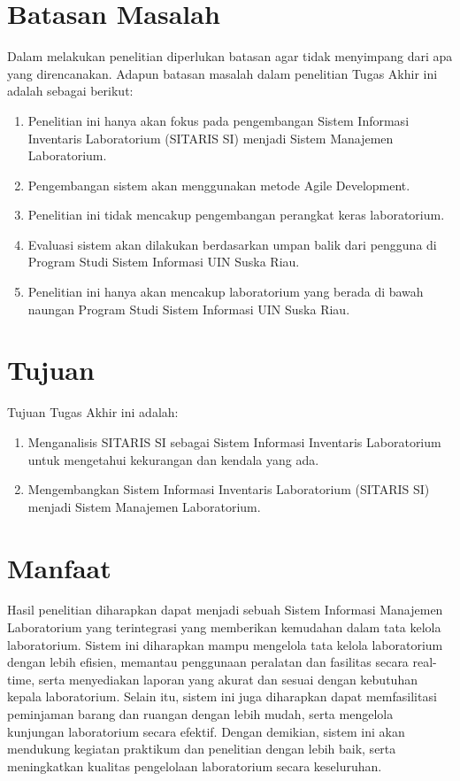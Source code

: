 \section{Batasan Masalah}
Dalam melakukan penelitian diperlukan batasan agar tidak menyimpang dari apa yang direncanakan. Adapun batasan masalah dalam penelitian Tugas Akhir ini adalah sebagai berikut:
\begin{enumerate}
	\item Penelitian ini hanya akan fokus pada pengembangan Sistem Informasi Inventaris Laboratorium (SITARIS SI) menjadi Sistem Manajemen Laboratorium.
	\item Pengembangan sistem akan menggunakan metode Agile Development.
	\item Penelitian ini tidak mencakup pengembangan perangkat keras laboratorium.
	\item Evaluasi sistem akan dilakukan berdasarkan umpan balik dari pengguna di Program Studi Sistem Informasi UIN Suska Riau.
	\item Penelitian ini hanya akan mencakup laboratorium yang berada di bawah naungan Program Studi Sistem Informasi UIN Suska Riau.
\end{enumerate}

\section{Tujuan}
Tujuan Tugas Akhir ini adalah:
\begin{enumerate}
	\item Menganalisis SITARIS SI sebagai Sistem Informasi Inventaris Laboratorium untuk mengetahui kekurangan dan kendala yang ada.
	\item Mengembangkan Sistem Informasi Inventaris Laboratorium (SITARIS SI) menjadi Sistem Manajemen Laboratorium.
\end{enumerate}

\section{Manfaat}
Hasil penelitian diharapkan dapat menjadi sebuah Sistem Informasi Manajemen Laboratorium yang terintegrasi yang memberikan kemudahan dalam tata kelola laboratorium. Sistem ini diharapkan mampu mengelola tata kelola laboratorium dengan lebih efisien, memantau penggunaan peralatan dan fasilitas secara real-time, serta menyediakan laporan yang akurat dan sesuai dengan kebutuhan kepala laboratorium. Selain itu, sistem ini juga diharapkan dapat memfasilitasi peminjaman barang dan ruangan dengan lebih mudah, serta mengelola kunjungan laboratorium secara efektif. Dengan demikian, sistem ini akan mendukung kegiatan praktikum dan penelitian dengan lebih baik, serta meningkatkan kualitas pengelolaan laboratorium secara keseluruhan.
